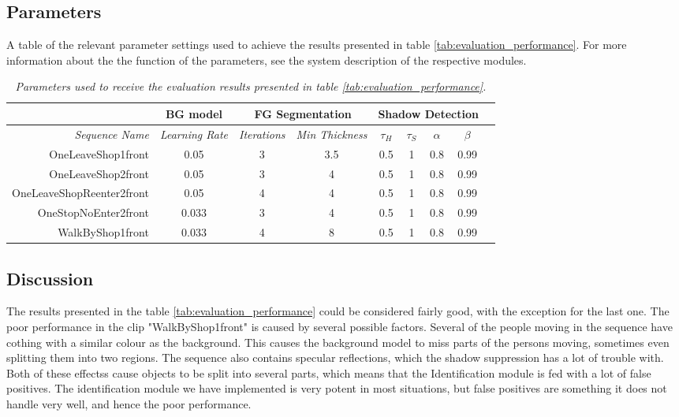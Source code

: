 \subsection{Parameters}
A table of the relevant parameter settings used to achieve the results presented in table \ref{tab:evaluation_performance}. For more information about the the function of the parameters, see the system description of the respective modules.
\begin{table}[h]
\centering
	\begin{tabular}{r | c || c | c || c | c | c | c | c }
	&	\multicolumn{1}{|c||}{BG model} & \multicolumn{2}{c||}{FG Segmentation} & \multicolumn{4}{c|}{Shadow Detection} \\
		\hline
		\emph{Sequence Name} & \emph{Learning Rate} & \emph{Iterations} & \emph{Min Thickness} &\emph{$\tau_H$} & \emph{$\tau_S$} & \emph{$\alpha$} & \emph{$\beta$}\\ 
		\hline \hline
		OneLeaveShop1front			& 0.05 		& 3 & 3.5 	& 0.5 & 1 & 0.8 & 0.99\\
		OneLeaveShop2front			& 0.05 		& 3 & 4 	& 0.5 & 1 & 0.8 & 0.99\\
		OneLeaveShopReenter2front	& 0.05		& 4 & 4 	& 0.5 & 1 & 0.8 & 0.99\\
		OneStopNoEnter2front 		& 0.033		& 3 & 4 	& 0.5 & 1 & 0.8 & 0.99\\
		WalkByShop1front 			& 0.033 	& 4 & 8 	& 0.5 & 1 & 0.8 & 0.99\\
	\end{tabular}
	\caption{\textit{Parameters used to receive the evaluation results presented in table \ref{tab:evaluation_performance}.}}
	\label{tab:evaluation_parameters}
\end{table}

\subsection{Discussion}
The results presented in the table \ref{tab:evaluation_performance} could be considered fairly good, with the exception for the last one. The poor performance in the clip "WalkByShop1front" is caused by several possible factors. Several of the people moving in the sequence have cothing with a similar colour as the background. This causes the background model to miss parts of the persons moving, sometimes even splitting them into two regions. The sequence also contains specular reflections, which the shadow suppression has a lot of trouble with. Both of these effectss cause objects to be split into several parts, which means that the Identification module is fed with a lot of false positives. The identification module we have implemented is very potent in most situations, but false positives are something it does not handle very well, and hence the poor performance.


